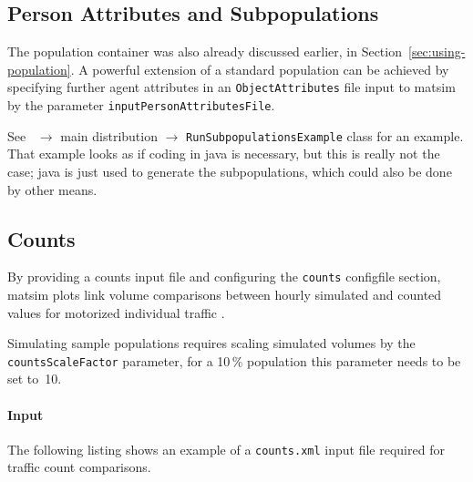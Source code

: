 
\subsection{Person Attributes and Subpopulations}
\label{sec:extending-population}

The population container was also already discussed earlier, in Section~\ref{sec:using-population}.
%
A powerful extension of a standard population can be achieved by specifying further agent attributes in an \lstinline|ObjectAttributes| file input to \gls{matsim} by the parameter \lstinline|inputPersonAttributesFile|. 
%

See \javadoc\ $\to$ main distribution $\to$ \lstinline{RunSubpopulationsExample} class for an example.  That example looks as if coding in \gls{java} is necessary, but this is really not the case; \gls{java} is just used to generate the subpopulations, which could also  be done by other means.


\subsection{Counts}
\label{sec:extending-counts}
By providing a counts input file and configuring the \lstinline|counts| \gls{configfile} section, \gls{matsim} plots link volume comparisons between hourly simulated and counted values for motorized individual traffic \citep{Horni_unpub_IVT_2007}. 

Simulating sample populations requires scaling simulated volumes by the \lstinline|countsScaleFactor| parameter, \eg for a 10\,\% population this parameter needs to be set to~10.

\paragraph{Input}
The following listing shows an example of a \lstinline|counts.xml| input file required for traffic count comparisons. 

